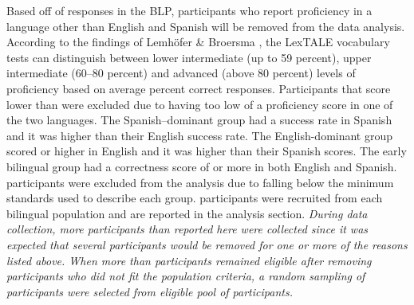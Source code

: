 Based off of responses in the BLP, participants who report proficiency in a language other than English and Spanish will be removed from the data analysis. According to the findings of Lemhöfer \& Broersma \parencite*{Lemhofer2012-hz}, the LexTALE vocabulary tests can distinguish between lower intermediate (up to 59 percent), upper intermediate (60–80 percent) and advanced (above 80 percent) levels of proficiency based on average percent correct responses. Participants that score lower than %
were excluded due to having too low of a proficiency score in one of the two languages. The Spanish–dominant group had a %
success rate in Spanish and it was higher than their English success rate. The English-dominant group scored %
or higher in English and it was higher than their Spanish scores. The early bilingual group had a correctness score of %
or more in both English and Spanish. %
participants were excluded from the analysis due to falling below the minimum standards used to describe each group. %
participants were recruited from each bilingual population and are reported in the analysis section. 
\emph{During data collection, more participants than reported here were collected since it was expected that several participants would be removed for one or more of the reasons listed above. When more than%
participants remained eligible after removing participants who did not fit the population criteria, a random sampling of %
participants were selected from eligible pool of participants.}



